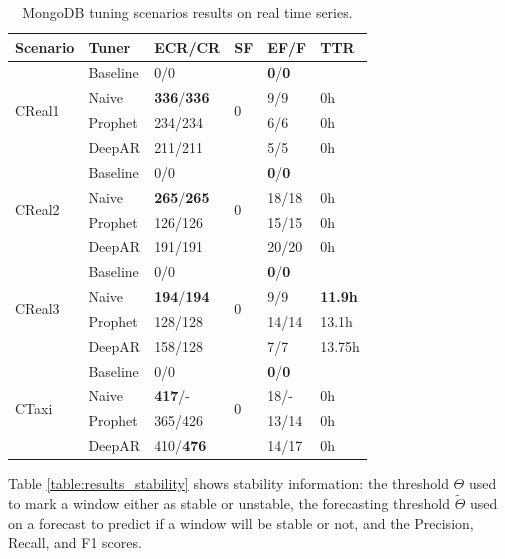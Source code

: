 \documentclass[a4paper, 12pt]{article} %
\newcommand{\ra}[1]{\renewcommand{\arraystretch}{#1}}
\begin{document}
	\begin{table}\centering 
		\ra{1.3}
		\begin{tabularx}{\textwidth}{@{}XXXXXX@{}}
			\toprule
			Scenario & Tuner & ECR/CR & SF & EF/F & TTR\\
			
			\midrule
			\multirow{4}{*}{CReal1}
			& Baseline & 0/0 & \multirow{4}{*}{0}  & \textbf{0}/\textbf{0} & \\
			& Naive & \textbf{336}/\textbf{336} && 9/9 & 0h \\
			& Prophet & 234/234 && 6/6 & 0h \\
			& DeepAR & 211/211 && 5/5 & 0h \\
			
			\midrule
			\multirow{4}{*}{CReal2}
			& Baseline & 0/0 & \multirow{4}{*}{0}  & \textbf{0}/\textbf{0} & \\
			& Naive & \textbf{265}/\textbf{265} && 18/18 & 0h \\
			& Prophet & 126/126 && 15/15 & 0h \\
			& DeepAR & 191/191 && 20/20 & 0h \\
			
			\midrule
			\multirow{4}{*}{CReal3}
			& Baseline & 0/0 & \multirow{4}{*}{0}  & \textbf{0}/\textbf{0} & \\
			& Naive & \textbf{194}/\textbf{194} && 9/9 & \textbf{11.9h} \\
			& Prophet & 128/128 && 14/14 & 13.1h \\
			& DeepAR & 158/128 && 7/7 & 13.75h \\
			
			\midrule
			\multirow{4}{*}{CTaxi}
			& Baseline & 0/0 & \multirow{4}{*}{0}  & \textbf{0}/\textbf{0} & \\
			& Naive & \textbf{417}/- && 18/- & 0h \\
			& Prophet & 365/426 && 13/14 & 0h \\
			& DeepAR & 410/\textbf{476} && 14/17 & 0h \\
			
			\bottomrule
		\end{tabularx}
		\caption{MongoDB tuning scenarios results on real time series.} \label{table:results_cassandra_real}
	\end{table}
	
	Table \ref{table:results_stability} shows stability information: the threshold $\Theta$ used to mark a window either as stable or unstable, the forecasting threshold $\tilde \Theta$ used on a forecast to predict if a window will be stable or not, and the Precision, Recall, and F1 scores. 
\end{document}
